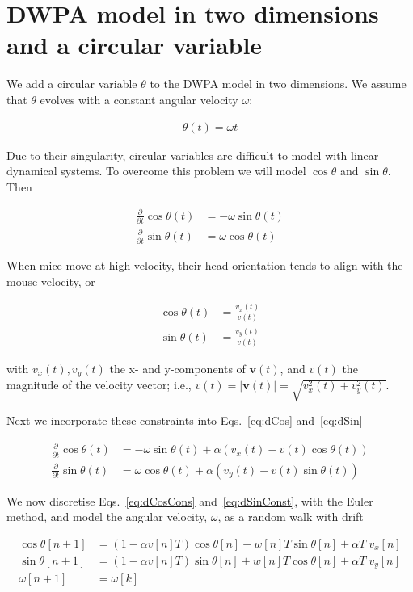 \documentclass[fleqn,12pt]{article}
\begin{document}
\section{DWPA model in two dimensions and a circular variable}

We add a circular variable $\theta$ to the DWPA model in two dimensions. We
assume that $\theta$ evolves with a constant angular velocity $\omega$:

\begin{align*}
    \theta(t)=\omega t
\end{align*}

Due to their singularity, circular variables are difficult to model with linear
dynamical systems. To overcome this problem we will model $\cos\theta$ and
$\sin\theta$. Then

\begin{align}
    \frac{\partial}{\partial
    t}\cos\theta(t)&=-\omega\sin\theta(t)\label{eq:dCos}\\
    \frac{\partial}{\partial t}\sin\theta(t)&=\omega\cos\theta(t)\label{eq:dSin}
\end{align}

When mice move at high velocity, their head orientation tends to align with the
mouse velocity, or

\begin{align*}
    \cos\theta(t)&=\frac{v_x(t)}{v(t)}\\
    \sin\theta(t)&=\frac{v_y(t)}{v(t)}
\end{align*}

\noindent with $v_x(t), v_y(t)$ the x- and y-components of $\mathbf{v}(t)$, and
$v(t)$ the magnitude of the velocity vector; i.e.,
$v(t)=|\mathbf{v}(t)|=\sqrt{v_x^2(t)+v_y^2(t)}$.

Next we incorporate these constraints into Eqs.~\ref{eq:dCos} and~\ref{eq:dSin}

\begin{align}
    \frac{\partial}{\partial t}\cos\theta(t)&=-\omega\sin\theta(t)+\alpha\left(v_x(t)-v(t)\cos\theta(t)\right)\label{eq:dCosCons}\\
    \frac{\partial}{\partial t}\sin\theta(t)&=\omega\cos\theta(t)+\alpha\left(v_y(t)-v(t)\sin\theta(t)\right)\label{eq:dSinConst}
\end{align}

We now discretise Eqs.~\ref{eq:dCosCons} and~\ref{eq:dSinConst}, with the
Euler method, and model the angular velocity, $\omega$, as a random walk with
drift

\begin{align}
    \cos\theta[n+1]&=\left(1-\alpha v[n]T\right)\cos\theta[n]-w[n]T\sin\theta[n]+\alpha T\;v_x[n]\\
    \sin\theta[n+1]&=\left(1-\alpha v[n]T\right)\sin\theta[n]+w[n]T\cos\theta[n]+\alpha T\;v_y[n]\\
    \omega[n+1]&=\omega[k]
\end{align}
\end{document}
